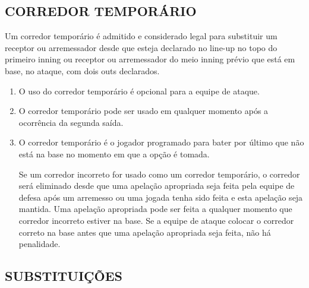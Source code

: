 \subsection{CORREDOR TEMPORÁRIO}

Um corredor temporário é admitido e considerado legal para substituir um receptor ou arremessador desde que esteja declarado no \gls{line-up} no topo do primeiro \gls{inning} ou receptor ou arremessador do meio \gls{inning} prévio que está em base, no ataque, com dois \glspl{out} declarados.

	\begin{enumerate}[label=(\alph*)]\item   O uso do corredor temporário é opcional para a equipe de ataque.
		\item  O corredor temporário pode ser usado em qualquer momento após a ocorrência da segunda saída.
		\item  O corredor temporário é o jogador programado para bater por último que não está na base no momento em que a opção é tomada.

		 Se um corredor incorreto for usado como um corredor temporário, o corredor será eliminado desde que uma apelação apropriada seja feita pela equipe de defesa após um arremesso ou uma jogada tenha sido feita e esta apelação  seja mantida. Uma apelação apropriada pode ser feita a qualquer momento que corredor incorreto estiver na base. Se a equipe de ataque colocar o corredor correto na base antes que uma apelação apropriada seja feita, não há penalidade.
	 \end{enumerate}

\subsection{SUBSTITUIÇÕES}

